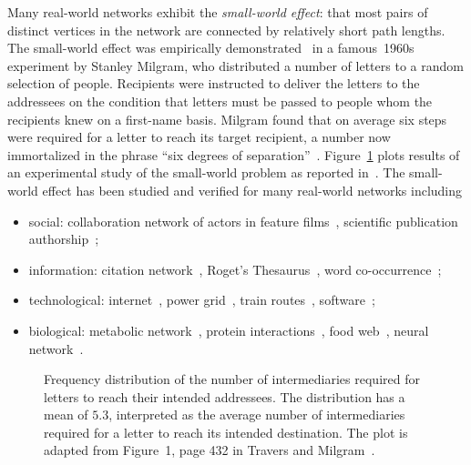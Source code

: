 Many real-world networks exhibit the
\emph{small-world effect}: that most pairs
of distinct vertices in the network are connected by relatively short
path lengths. The small-world effect was empirically
demonstrated~\cite{Milgram1967} in a famous~1960s experiment by
Stanley Milgram, who distributed a number
of letters to a random selection of people. Recipients were instructed
to deliver the letters to the addressees on the condition that letters
must be passed to people whom the recipients knew on a first-name
basis. Milgram found that on average six steps were required for a
letter to reach its target recipient, a number now immortalized in the
phrase ``six degrees of
separation''~\cite{Guare1990}.
Figure~\ref{fig:random_graphs:Milgram_small_world_experiment_results}
plots results of an experimental study of the small-world problem as
reported in~\cite{TraversMilgram1969}. The small-world effect has been
studied and verified for many real-world networks including
\begin{itemize}
\item social: collaboration network of actors in
  feature films~\cite{AmaralEtAl2000,WattsStrogatz1998}, scientific
  publication
  authorship~\cite{CastroGrossman1999,GrossmanIon1995,Newman2001a,Newman2001b};

\item information: citation
  network~\cite{Redner1998}, Roget's
  Thesaurus~\cite{Knuth1993}, word
  co-occurrence~\cite{DorogovtsevMendes2001,FerrerSole2001};

\item technological:
  internet~\cite{ChenEtAl2002,FaloutsosEtAl1999}, power
  grid~\cite{WattsStrogatz1998}, train routes~\cite{SenEtAl2003},
  software~\cite{Newman2003a,ValverdeEtAl2002};

\item biological: metabolic
  network~\cite{JeongEtAl2000}, protein
  interactions~\cite{JeongEtAl2001}, food
  web~\cite{HuxhamEtAl1996,Martinez1991}, neural
  network~\cite{WattsStrogatz1998,WhiteEtAl1986}.
\end{itemize}

\begin{figure}[!htbp]
\centering
{}

\caption{Frequency distribution of the number of intermediaries
  required for letters to reach their intended addressees. The
  distribution has a mean of $5.3$, interpreted as the average number
  of intermediaries required for a letter to reach its intended
  destination. The plot is adapted from Figure~1, page 432 in Travers
  and Milgram~\cite{TraversMilgram1969}.}
\label{fig:random_graphs:Milgram_small_world_experiment_results}
\end{figure}

